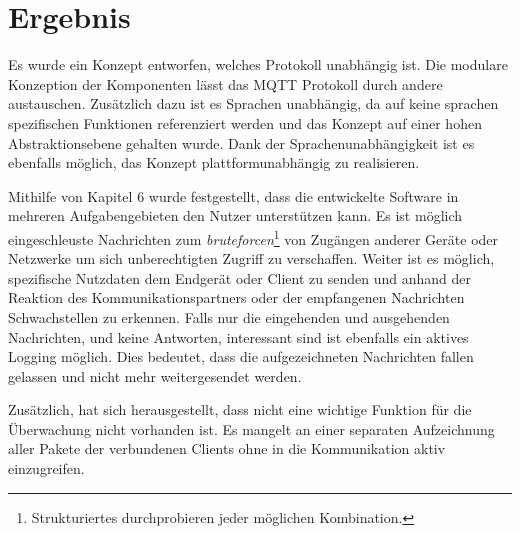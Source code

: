 \chapter{Ergebnis}

Es wurde ein Konzept entworfen, welches Protokoll unabhängig ist. Die modulare Konzeption der Komponenten lässt das \ac{MQTT} Protokoll durch andere austauschen. Zusätzlich dazu ist es Sprachen unabhängig, da auf keine sprachen spezifischen Funktionen referenziert werden und das Konzept auf einer hohen Abstraktionsebene gehalten wurde. Dank der Sprachenunabhängigkeit ist es ebenfalls möglich, das Konzept plattformunabhängig zu realisieren.

Mithilfe von Kapitel 6 wurde festgestellt, dass die entwickelte Software in mehreren Aufgabengebieten den Nutzer unterstützen kann.
Es ist möglich eingeschleuste Nachrichten zum \emph{bruteforcen}\footnote{Strukturiertes durchprobieren jeder möglichen Kombination.} von Zugängen anderer Geräte oder Netzwerke um sich unberechtigten Zugriff zu verschaffen.
Weiter ist es möglich, spezifische Nutzdaten dem Endgerät oder Client zu senden und anhand der Reaktion des Kommunikationspartners oder der empfangenen Nachrichten Schwachstellen zu erkennen.
Falls nur die eingehenden und ausgehenden Nachrichten, und keine Antworten, interessant sind ist ebenfalls ein aktives Logging möglich. Dies bedeutet, dass die aufgezeichneten Nachrichten fallen gelassen und nicht mehr weitergesendet werden.

Zusätzlich, hat sich herausgestellt, dass nicht eine wichtige Funktion für die Überwachung nicht vorhanden ist. Es mangelt an einer separaten Aufzeichnung aller Pakete der verbundenen Clients ohne in die Kommunikation aktiv einzugreifen.
